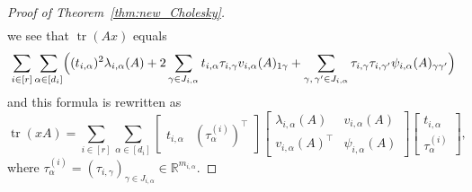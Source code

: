 \documentclass[12pt]{amsart}
\theoremstyle{plain}
\theoremstyle{definition}
\theoremstyle{remark}
\newcommand{\R}{\mathbb{R}}
\newcommand{\1}{\mathbf{1}}
\newcommand{\tr}{\operatorname{tr}}
\begin{document}
\begin{proof}[Proof of Theorem~\ref{thm:new_Cholesky}]
\begin{align*}
\end{align*}
 we see that $\tr(Ax)$  equals
$$
\sum_{i\in[r]} \sum_{\alpha\in[d_i]} 
\Bigl( (t_{i,\alpha})^2 \lambda_{i,\alpha}(A)
+2 \sum_{\gamma \in J_{i,\alpha}}
    t_{i,\alpha} \tau_{i,\gamma}  v_{i,\alpha}(A)_{1 \gamma} 
+ \sum_{\gamma,\, \gamma' \in J_{i,\alpha}}
 \tau_{i,\gamma} \tau_{i, \gamma'} \psi_{i,\alpha}(A)_{\gamma \gamma'} \Bigr)
$$
 and this formula is rewritten as
\begin{equation*}
 \tr(xA) =
\sum_{i\in[r]} \sum_{\alpha\in[d_i]} 
\begin{bmatrix} t_{i,\alpha} & (\tau^{(i)}_\alpha)^\top \end{bmatrix}
\begin{bmatrix} \lambda_{i,\alpha}(A) &  v_{i,\alpha}(A) \\
 v_{i,\alpha}(A)^\top & \psi_{i,\alpha}(A) \end{bmatrix}
\begin{bmatrix} t_{i,\alpha} \\ \tau^{(i)}_\alpha \end{bmatrix},
\end{equation*}
where $\tau_{\alpha}^{(i)}=(\tau_{i,\gamma})_{\gamma\in J_{i,\alpha}}\in \R^{m_{i,\alpha}}$.


\end{proof}
\end{document}
